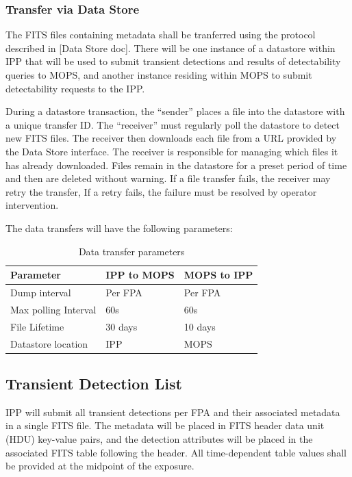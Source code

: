 \documentclass[panstarrs,spec]{panstarrs}
\begin{document}
\subsubsection{Transfer via Data Store}

The FITS files containing metadata shall be tranferred using the protocol 
described in [Data Store doc]. There will be one instance of a datastore 
within IPP that will be used to submit transient detections and results 
of detectability queries to MOPS, and
another instance residing within MOPS to submit detectability requests to the IPP.

During a datastore transaction, the ``sender'' places a file into the datastore with a unique
transfer ID. The ``receiver'' must regularly poll the datastore to
detect new FITS files. The receiver then downloads each file from a URL
provided by the Data Store interface. The receiver is responsible for
managing which files it has already downloaded. Files remain in
the datastore for a preset period of time and then are deleted without
warning. If a file transfer fails, the receiver may retry the transfer,
If a retry fails, the failure must be resolved by operator intervention.

The data transfers will have the following parameters:

\begin{table}[htbp]
  \begin{center}
    \caption{Data transfer parameters}
    \begin{tabular}{|l|l|l|}
      \hline
      \hline
      {\bf Parameter} & {\bf IPP to MOPS} & {\bf MOPS to IPP} \\ 
      \hline
      Dump interval & Per FPA & Per FPA \\
      Max polling Interval & 60s & 60s \\
      File Lifetime & 30 days & 10 days \\
      Datastore location & IPP & MOPS \\ \hline
    \end{tabular}
  \end{center}
\end{table}

\subsection{Transient Detection List}

IPP will submit all transient detections per FPA and their associated
metadata in a single FITS file.  The metadata will be placed in FITS
header data unit (HDU) key-value pairs, and the detection attributes
will be placed in the associated FITS table following the header.  All
time-dependent table values shall be provided at the midpoint of the
exposure.
\end{document}
